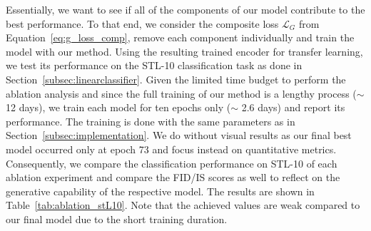 \documentclass[a4paper,12pt]{report}
\begin{document}
Essentially, we want to see if all of the components of our model contribute to the best performance. To that end, we consider the composite loss $\mathcal{L}_{G}$ from Equation~\ref{eq:g_loss_comp}, remove each component individually and train the model with our method. Using the resulting trained encoder for transfer learning, we test its performance on the STL-10 classification task as done in Section~\ref{subsec:linearclassifier}. Given the limited time budget to perform the ablation analysis and since the full training of our method is a lengthy process ($\sim$ 12 days), we train each model for ten epochs only ($\sim$ 2.6 days) and report its performance. The training is done with the same parameters as in Section~\ref{subsec:implementation}. We do without visual results as our final best model occurred only at epoch 73 and focus instead on quantitative metrics. Consequently, we compare the classification performance on STL-10 of each ablation experiment and compare the FID/IS scores as well to reflect on the generative capability of the respective model. The results are shown in Table~\ref{tab:ablation_stL10}. Note that the achieved values are weak compared to our final model due to the short training duration.
\end{document}
